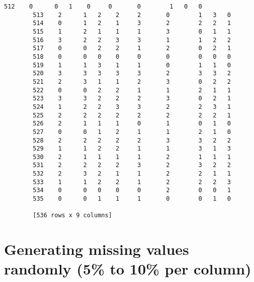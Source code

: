 \documentclass[11pt]{article}
\begin{document}
\begin{Verbatim}[commandchars=\\\{\}]
        512    0      0   1    0     0       0        1   0   0
        513    2      1   2    2     2       0        1   3   0
        514    0      1   2    1     3       2        2   2   1
        515    1      2   1    1     1       3        0   1   1
        516    3      2   2    3     3       1        1   2   2
        517    0      0   2    2     1       2        0   2   1
        518    0      0   0    0     0       0        0   0   0
        519    1      1   3    1     1       0        1   1   0
        520    3      3   3    3     3       2        3   3   2
        521    2      3   1    1     2       3        0   2   2
        522    0      0   2    2     1       1        2   1   1
        523    3      3   2    2     2       3        0   2   1
        524    1      2   2    3     3       2        2   3   1
        525    2      2   2    2     2       2        2   2   1
        526    2      1   1    1     0       1        0   1   0
        527    0      0   1    2     1       1        2   1   0
        528    2      2   2    2     2       3        3   2   2
        529    1      1   2    2     1       1        3   1   3
        530    2      1   1    1     1       2        1   1   1
        531    2      2   2    2     3       2        3   2   2
        532    2      3   2    1     1       2        2   1   1
        533    1      1   2    2     1       2        2   2   3
        534    0      0   0    0     0       2        0   0   1
        535    0      0   1    1     1       0        0   1   0
        
        [536 rows x 9 columns]
\end{Verbatim}
            
    \hypertarget{generating-missing-values-randomly-5-to-10-per-column}{%
\section{Generating missing values randomly (5\% to 10\% per
column)}\label{generating-missing-values-randomly-5-to-10-per-column}}
\end{document}
